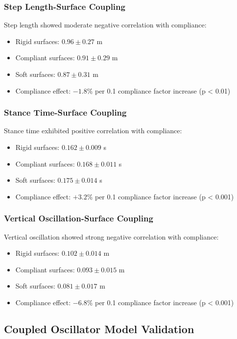 \documentclass[12pt]{article}
\begin{document}
\subsubsection{Step Length-Surface Coupling}
Step length showed moderate negative correlation with compliance:
\begin{itemize}
\item Rigid surfaces: $0.96 \pm 0.27$ m
\item Compliant surfaces: $0.91 \pm 0.29$ m
\item Soft surfaces: $0.87 \pm 0.31$ m
\item Compliance effect: $-1.8\%$ per 0.1 compliance factor increase (p < 0.01)
\end{itemize}

\subsubsection{Stance Time-Surface Coupling}
Stance time exhibited positive correlation with compliance:
\begin{itemize}
\item Rigid surfaces: $0.162 \pm 0.009$ s
\item Compliant surfaces: $0.168 \pm 0.011$ s
\item Soft surfaces: $0.175 \pm 0.014$ s
\item Compliance effect: $+3.2\%$ per 0.1 compliance factor increase (p < 0.001)
\end{itemize}

\subsubsection{Vertical Oscillation-Surface Coupling}
Vertical oscillation showed strong negative correlation with compliance:
\begin{itemize}
\item Rigid surfaces: $0.102 \pm 0.014$ m
\item Compliant surfaces: $0.093 \pm 0.015$ m
\item Soft surfaces: $0.081 \pm 0.017$ m
\item Compliance effect: $-6.8\%$ per 0.1 compliance factor increase (p < 0.001)
\end{itemize}

\subsection{Coupled Oscillator Model Validation}
\end{document}
